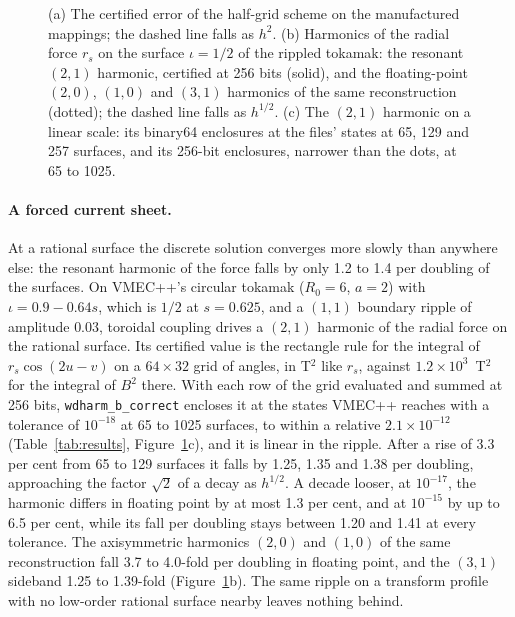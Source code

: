 \documentclass[11pt]{article}
\newcommand{\code}[1]{\texttt{#1}}
\begin{document}
\begin{figure}[t]
\caption{(a) The certified error of the half-grid scheme on the manufactured
mappings; the dashed line falls as $h^2$. (b) Harmonics of the radial force $r_s$
on the surface $\iota=1/2$ of the rippled tokamak: the resonant $(2,1)$ harmonic,
certified at 256 bits (solid), and the floating-point $(2,0)$, $(1,0)$ and
$(3,1)$ harmonics of the same reconstruction (dotted); the dashed line falls as
$h^{1/2}$. (c) The $(2,1)$ harmonic on a linear scale: its binary64 enclosures
at the files' states at 65, 129 and 257 surfaces, and its 256-bit enclosures,
narrower than the dots, at 65 to 1025.}\label{fig:conv}
\end{figure}

\paragraph{A forced current sheet.}
At a rational surface the discrete solution converges more slowly than
anywhere else: the resonant harmonic of the force falls by only 1.2 to 1.4 per
doubling of the surfaces. On VMEC++'s circular tokamak ($R_0=6$, $a=2$) with
$\iota=0.9-0.64s$, which is $1/2$ at $s=0.625$, and a $(1,1)$ boundary ripple of
amplitude $0.03$, toroidal coupling drives a $(2,1)$ harmonic of the radial
force on the rational surface. Its certified value is the rectangle rule for
the integral of $r_s\cos(2u-v)$ on a $64\times32$ grid of angles, in T$^2$ like
$r_s$, against $1.2\times10^3$~T$^2$ for the integral of $B^2$ there. With each
row of the grid evaluated and summed at 256 bits, \code{wdharm\_b\_correct}
encloses it at the states VMEC++ reaches with a tolerance of $10^{-18}$ at 65
to 1025 surfaces, to within a relative $2.1\times10^{-12}$
(Table~\ref{tab:results}, Figure~\ref{fig:conv}c), and it is linear in the
ripple. After a rise of 3.3 per cent from 65 to 129 surfaces it falls by 1.25,
1.35 and 1.38 per doubling, approaching the factor $\sqrt2$ of a decay as
$h^{1/2}$. A decade looser, at $10^{-17}$, the harmonic differs in floating
point by at most 1.3 per cent, and at $10^{-15}$ by up to 6.5 per cent, while
its fall per doubling stays between 1.20 and 1.41 at every tolerance. The axisymmetric harmonics $(2,0)$ and $(1,0)$ of the same
reconstruction fall 3.7 to 4.0-fold per doubling in floating point, and the
$(3,1)$ sideband 1.25 to 1.39-fold (Figure~\ref{fig:conv}b). The same ripple on
a transform profile with no low-order rational surface nearby leaves nothing
behind.
\end{document}
